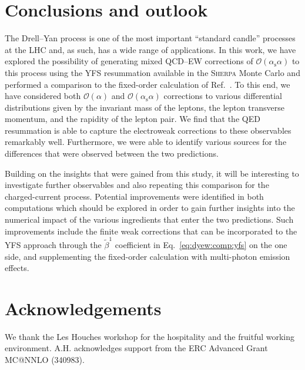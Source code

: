 \documentclass[11pt]{cernrep}
\newcommand{\order}{\ensuremath{\mathcal{O}}}
\newcommand{\alphas}{\ensuremath{\alpha_\mathrm{s}}}
\begin{document}
\section{Conclusions and outlook}
\label{sec:dyew:conclusions}

The Drell--Yan process is one of the most important ``standard candle'' 
processes at the LHC and, as such, has a wide range of applications.
In this work, we have explored the possibility of generating mixed 
QCD--EW corrections of $\order(\alphas\alpha)$ to this process using 
the YFS resummation available in the \textsc{Sherpa} Monte Carlo and 
performed a comparison to the fixed-order calculation of 
Ref.~\cite{Dittmaier:2015rxo}. To this end, we have considered both 
$\order(\alpha)$ and $\order(\alphas\alpha)$ corrections to various 
differential distributions given by the invariant mass of the leptons, 
the lepton transverse momentum, and the rapidity of the lepton pair.
We find that the QED resummation is able to capture the electroweak 
corrections to these observables remarkably well.
Furthermore, we were able to identify various sources for the differences 
that were observed between the two predictions.

Building on the insights that were gained from this study, it will 
be interesting to investigate further observables and also repeating 
this comparison for the charged-current process. Potential 
improvements were identified in both computations which should be 
explored in order to gain further insights into the numerical impact of 
the various ingredients that enter the two predictions. Such 
improvements include the finite weak corrections that can be 
incorporated to the YFS approach through the $\tilde{\beta}^1$ 
coefficient in Eq.~\eqref{eq:dyew:comp:yfs} on the one side, and 
supplementing the fixed-order calculation with multi-photon emission 
effects. 


\section*{Acknowledgements}

We thank the Les Houches workshop for the hospitality 
and the fruitful working environment. 
A.H. acknowledges support from the ERC Advanced Grant MC@NNLO (340983).


\end{document}
